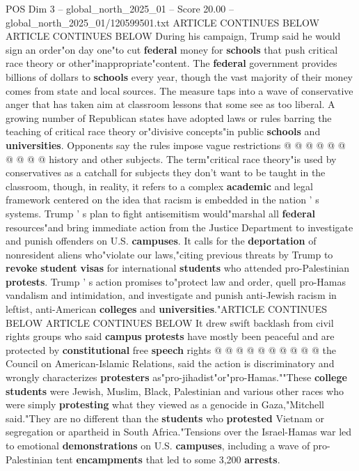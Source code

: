 \begin{textsample}{POS Dim 3 – global\_north\_2025\_01 – Score 20.00 – global\_north\_2025\_01/120599501.txt}
ARTICLE CONTINUES BELOW ARTICLE CONTINUES BELOW During his campaign, Trump said he would sign an order"on day one"to cut \textbf{federal} money for \textbf{schools} that push critical race theory or other"inappropriate"content.
The \textbf{federal} government provides billions of dollars to \textbf{schools} every year, though the vast majority of their money comes from state and local sources.
The measure taps into a wave of conservative anger that has taken aim at classroom lessons that some see as too liberal.
A growing number of Republican states have adopted laws or rules barring the teaching of critical race theory or"divisive concepts"in public \textbf{schools} and \textbf{universities}.
Opponents say the rules impose vague restrictions @ @ @ @ @ @ @ @ @ @ history and other subjects.
The term"critical race theory"is used by conservatives as a catchall for subjects they don't want to be taught in the classroom, though, in reality, it refers to a complex \textbf{academic} and legal framework centered on the idea that racism is embedded in the nation ' s systems.
Trump ' s plan to fight antisemitism would"marshal all \textbf{federal} resources"and bring immediate action from the Justice Department to investigate and punish offenders on U.S. \textbf{campuses}.
It calls for the \textbf{deportation} of nonresident aliens who"violate our laws,"citing previous threats by Trump to \textbf{revoke} \textbf{student} \textbf{visas} for international \textbf{students} who attended pro-Palestinian \textbf{protests}.
Trump ' s action promises to"protect law and order, quell pro-Hamas vandalism and intimidation, and investigate and punish anti-Jewish racism in leftist, anti-American \textbf{colleges} and \textbf{universities}."ARTICLE CONTINUES BELOW ARTICLE CONTINUES BELOW It drew swift backlash from civil rights groups who said \textbf{campus} \textbf{protests} have mostly been peaceful and are protected by \textbf{constitutional} free \textbf{speech} rights @ @ @ @ @ @ @ @ @ @ the Council on American-Islamic Relations, said the action is discriminatory and wrongly characterizes \textbf{protesters} as"pro-jihadist"or"pro-Hamas.""These \textbf{college} \textbf{students} were Jewish, Muslim, Black, Palestinian and various other races who were simply \textbf{protesting} what they viewed as a genocide in Gaza,"Mitchell said."They are no different than the \textbf{students} who \textbf{protested} Vietnam or segregation or apartheid in South Africa."Tensions over the Israel-Hamas war led to emotional \textbf{demonstrations} on U.S. \textbf{campuses}, including a wave of pro-Palestinian tent \textbf{encampments} that led to some 3,200 \textbf{arrests}.

\end{textsample}
